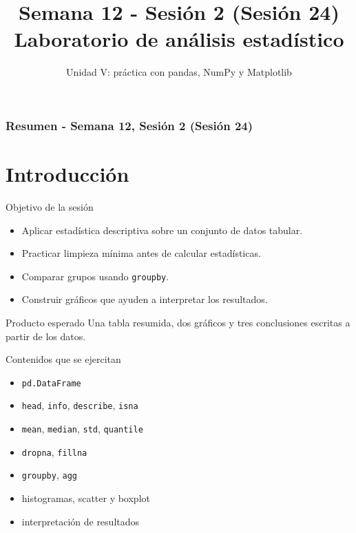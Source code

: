 \documentclass[10pt]{beamer}
\title[Semana 12 - P2]{Semana 12 - Sesión 2 (Sesión 24)\\Laboratorio de análisis estadístico}
\subtitle{Unidad V: práctica con pandas, NumPy y Matplotlib}
\begin{document}
\myfront{}

\begin{frame}
  \titlepage
\end{frame}

\begin{frame}
  \frametitle{Resumen - Semana 12, Sesión 2 (Sesión 24)}
  \tableofcontents
\end{frame}


\section{Introducción}

\begin{frame}{Objetivo de la sesión}
  \begin{itemize}
    \item Aplicar estadística descriptiva sobre un conjunto de datos tabular.
    \item Practicar limpieza mínima antes de calcular estadísticas.
    \item Comparar grupos usando \texttt{groupby}.
    \item Construir gráficos que ayuden a interpretar los resultados.
  \end{itemize}
  \begin{alertblock}{Producto esperado}
    Una tabla resumida, dos gráficos y tres conclusiones escritas a partir de los datos.
  \end{alertblock}
\end{frame}

\begin{frame}{Contenidos que se ejercitan}
  \begin{itemize}
    \item \texttt{pd.DataFrame}
    \item \texttt{head}, \texttt{info}, \texttt{describe}, \texttt{isna}
    \item \texttt{mean}, \texttt{median}, \texttt{std}, \texttt{quantile}
    \item \texttt{dropna}, \texttt{fillna}
    \item \texttt{groupby}, \texttt{agg}
    \item histogramas, scatter y boxplot
    \item interpretación de resultados
  \end{itemize}
\end{frame}
\end{document}
